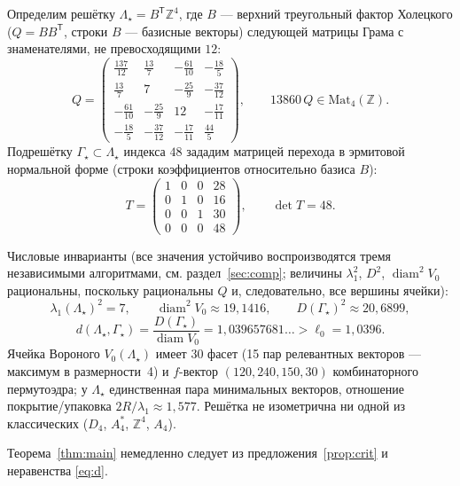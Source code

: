 \documentclass[12pt]{article}
\theoremstyle{definition}
\theoremstyle{remark}
\newcommand{\Z}{\mathbb{Z}}
\newcommand{\diam}{\operatorname{diam}}
\begin{document}
Определим решётку $\Lambda_\star=B^{\mathsf T}\Z^4$, где $B$ --- верхний
треугольный фактор Холецкого ($Q=BB^{\mathsf T}$, строки $B$ --- базисные
векторы) следующей матрицы Грама с знаменателями, не превосходящими $12$:
\begin{equation}\label{eq:gram}
Q=\begin{pmatrix}
\tfrac{137}{12} & \tfrac{13}{7}  & -\tfrac{61}{10} & -\tfrac{18}{5}\\[2pt]
\tfrac{13}{7}   & 7              & -\tfrac{25}{9}  & -\tfrac{37}{12}\\[2pt]
-\tfrac{61}{10} & -\tfrac{25}{9} & 12              & -\tfrac{17}{11}\\[2pt]
-\tfrac{18}{5}  & -\tfrac{37}{12}& -\tfrac{17}{11} & \tfrac{44}{5}
\end{pmatrix},
\qquad
13860\,Q\in\mathrm{Mat}_4(\Z).
\end{equation}
Подрешётку $\Gamma_\star\subset\Lambda_\star$ индекса $48$ зададим матрицей
перехода в эрмитовой нормальной форме (строки коэффициентов относительно
базиса $B$):
\begin{equation}\label{eq:hnf}
T=\begin{pmatrix}
1&0&0&28\\
0&1&0&16\\
0&0&1&30\\
0&0&0&48
\end{pmatrix},
\qquad \det T=48 .
\end{equation}

Числовые инварианты (все значения устойчиво воспроизводятся тремя независимыми
алгоритмами, см. раздел~\ref{sec:comp}; величины $\lambda_1^2$, $D^2$,
$\diam^2 V_0$ рациональны, поскольку рациональны $Q$ и, следовательно, все
вершины ячейки):
\[
\lambda_1(\Lambda_\star)^2=7,\qquad
\diam^2 V_0\approx 19{,}1416,\qquad
D(\Gamma_\star)^2\approx 20{,}6899,
\]
\begin{equation}\label{eq:d}
d(\Lambda_\star,\Gamma_\star)=\frac{D(\Gamma_\star)}{\diam V_0}
=1{,}039657681\ldots>\ell_0=1{,}0396 .
\end{equation}
Ячейка Вороного $V_0(\Lambda_\star)$ имеет $30$ фасет (15 пар релевантных
векторов --- максимум в размерности~4) и $f$-вектор $(120,240,150,30)$
комбинаторного пермутоэдра; у $\Lambda_\star$ единственная пара минимальных
векторов, отношение покрытие/упаковка $2R/\lambda_1\approx1{,}577$. Решётка не
изометрична ни одной из классических ($D_4$, $A_4^*$, $\Z^4$, $A_4$).

Теорема~\ref{thm:main} немедленно следует из
предложения~\ref{prop:crit} и неравенства \eqref{eq:d}.
\end{document}
